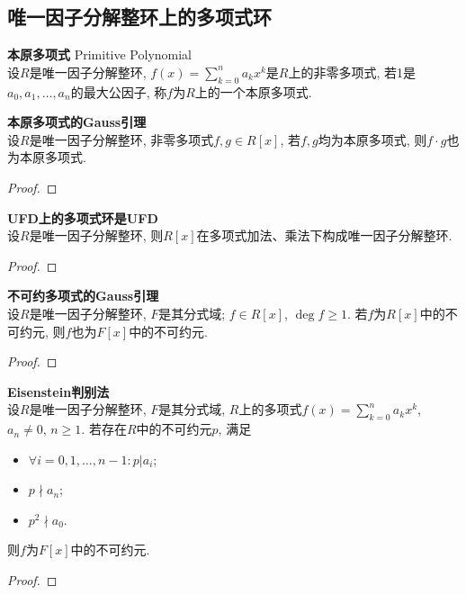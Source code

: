 \subsection{唯一因子分解整环上的多项式环}

\begin{dfn} \textbf{本原多项式} Primitive Polynomial\\
设$R$是唯一因子分解整环, $f(x)=\sum_{k=0}^n a_k x^k$是$R$上的非零多项式, 若1是$a_0, a_1, \dots, a_n$的最大公因子, 称$f$为$R$上的一个本原多项式. 
\end{dfn}

\begin{pro} \textbf{本原多项式的Gauss引理}\\
设$R$是唯一因子分解整环, 非零多项式$f, g\in R[x]$, 若$f, g$均为本原多项式, 则$f\cdot g$也为本原多项式. 
\end{pro}

\begin{proof}
\end{proof}

\begin{pro} \textbf{UFD上的多项式环是UFD}\\
设$R$是唯一因子分解整环, 则$R[x]$在多项式加法、乘法下构成唯一因子分解整环. 
\end{pro}
\begin{proof}

\end{proof}


\begin{pro} \textbf{不可约多项式的Gauss引理}\\
设$R$是唯一因子分解整环, $F$是其分式域; $f\in R[x]$, $\deg f\ge 1$. 若$f$为$R[x]$中的不可约元, 则$f$也为$F[x]$中的不可约元. 
\end{pro}
\begin{proof}
\end{proof}

\begin{thm} \textbf{Eisenstein判别法}\\
设$R$是唯一因子分解整环, $F$是其分式域, $R$上的多项式$f(x)=\sum_{k=0}^n a_k x^k$, $a_n\neq 0$, $n\ge 1$. 若存在$R$中的不可约元$p$, 满足
\begin{itemize}
    \item $\forall i=0,1,\dots, n-1: p\vert a_i$;
    \item $p\nmid a_n$;
    \item $p^2 \nmid a_0$.
\end{itemize}
则$f$为$F[x]$中的不可约元. 
\end{thm}
\begin{proof}

\end{proof}

